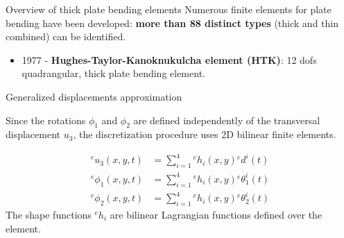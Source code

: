 \documentclass[aspectratio=169]{beamer}
\begin{document}
\begin{frame}{Overview of thick plate bending elements}
  Numerous finite elements for plate bending have been developed: \textbf{more than 88 distinct types} (thick and thin combined) can be identified.
  \begin{center}
  \end{center}
  \begin{itemize}
    \item  1977 - \textbf{Hughes-Taylor-Kanoknukulcha element (HTK)}: 12 dofs quadrangular, thick plate bending element.
  \end{itemize}
\end{frame}

\begin{frame}{Generalized displacements approximation}
  \begin{block}{}
    Since the rotations $\phi_1$ and $\phi_2$ are defined independently of the transversal displacement $u_3$, the discretization procedure uses 2D bilinear finite elements.
  \end{block}
  \vspace{-0.2cm}
  \begin{align*}
    {}^eu_3(x,y,t)    & = \sum_{i=1}^{4}{}^eh_{i}(x,y){}^ed^{i}(t)        \\[5pt]
    {}^e\phi_1(x,y,t) & = \sum_{i=1}^{4}{}^eh_{i}(x,y){}^e\theta^{i}_1(t) \\[5pt]
    {}^e\phi_2(x,y,t) & = \sum_{i=1}^{4}{}^eh_{i}(x,y){}^e\theta^{i}_2(t)
  \end{align*}
  The shape functions ${}^e h_i$ are bilinear Lagrangian functions defined over the element.
\end{frame}
\end{document}
